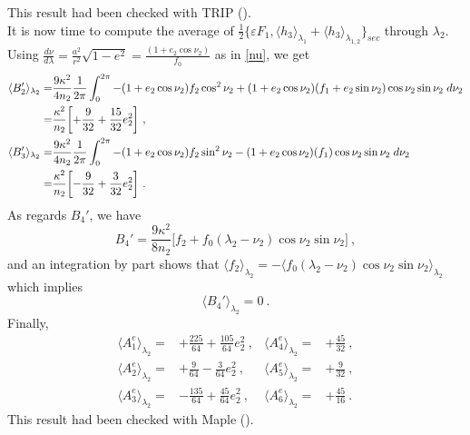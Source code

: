 \documentclass[a4paper]{article}
\begin{document}
This result had been checked with TRIP (\cite{trip}). \\
It is now time to compute the average of $\frac{1}{2}\{\varepsilon F_{1}, \langle  h_{3} \rangle  _{\lambda_{1}} +  \langle h_{3} \rangle _{\lambda_{1,2}}\}_{sec}$ through $\lambda_{2}$. \\
Using $\frac{d\nu}{d\lambda}=\frac{a^{2}}{r^{2}}\sqrt{1-e^{2}}=\frac{(1+e_{2}\cos{\nu_{2}})}{f_{0}}$ as in \eqref{nu}, we get
\begin{align}
\langle B_{2}' \rangle _{\lambda_{2}} =& \frac{9\kappa^2}{4n_{2}}\frac{1}{2\pi} \int_{0}^{2\pi} -(1+e_{2}\cos{\nu_{2}})f_{2}\cos^2{\nu_{2}}+(1+e_{2}\cos{\nu_{2}})(f_{1}+e_{2}\sin{\nu_{2}})\cos{\nu_{2}}\sin{\nu_{2}} \; d\nu_{2}  \notag \\
=& \frac{\kappa^2}{n_{2}} \biggl[ +\frac{9}{32}+\frac{15}{32}e_{2}^{2} \biggr] \ , \\
\langle B_{3}' \rangle _{\lambda_{2}} =& \frac{9\kappa^2}{4n_{2}}\frac{1}{2\pi} \int_{0}^{2\pi} -(1+e_{2}\cos{\nu_{2}})f_{2}\sin^2{\nu_{2}}-(1+e_{2}\cos{\nu_{2}})(f_{1})\cos{\nu_{2}}\sin{\nu_{2}} \; d\nu_{2}  \notag \\
=& \frac{\kappa^2}{n_{2}} \biggl[ -\frac{9}{32}+\frac{3}{32}e_{2}^{2} \biggr] \ .
\end{align}
As regards $B_{4}'$, we have 
\begin{equation}
B_{4}'=\frac{9\kappa^{2}}{8n_{2}} \bigl[ f_{2}+f_{0}(\lambda_{2}-\nu_{2})\cos{\nu_{2}}\sin{\nu_{2}} \bigr] \ ,
\end{equation}
and an integration by part shows that $\langle f_{2} \rangle _{\lambda_{2}}=-\langle f_{0}(\lambda_{2}-\nu_{2})\cos{\nu_{2}}\sin{\nu_{2}} \rangle _{\lambda_{2}}$ which implies
\begin{equation}
\langle B_{4}' \rangle _{\lambda_{2}}=0 \ .
\end{equation}
Finally,
\begin{align}
\langle A_{1}^{e} \rangle _{\lambda_{2}} =& +\frac{225}{64}+\frac{105}{64}e_{2}^{2} \ ,  &\langle A_{4}^{e} \rangle _{\lambda_{2}}=& +\frac{45}{32} \ , \\
\langle A_{2}^{e} \rangle _{\lambda_{2}} =& +\frac{9}{64}-\frac{3}{64}e_{2}^{2}  \ ,  &\langle A_{5}^{e} \rangle _{\lambda_{2}}=& +\frac{9}{32}  \ , \\
\langle A_{3}^{e} \rangle _{\lambda_{2}} =& -\frac{135}{64}+\frac{45}{64}e_{2}^{2}  \ ,  &\langle A_{6}^{e} \rangle _{\lambda_{2}}=& +\frac{45}{16} \ .
\end{align}
This result had been checked with Maple (\cite{maple}). 
\end{document}
